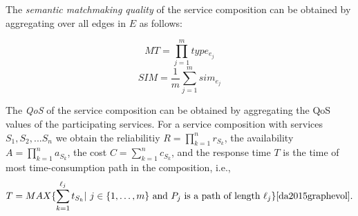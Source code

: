 \documentclass{llncs}
\begin{document}






The \emph{semantic matchmaking quality} of the service composition can be obtained by aggregating over all edges in $E$ as follows:

\begin{equation}
\label{equation6}
MT {=} \prod_{j=1}^{m} type_ {e_{j}}
\end{equation}
\begin{equation}
\label{equation7}
SIM {=} \frac{1}{m}\sum_{j=1}^m sim_ {e_{j}}
\end{equation}

The \emph{QoS} of the service composition can be obtained by aggregating the QoS values of the participating services. For a service composition with services $ S_1, S_2, ... S_n$ we obtain the reliabilitiy $R=\prod\limits^n_{k=1}r_{S_k}$, the availability $A=\prod\limits^n_{k=1}a_{S_k}$, the cost $C=\sum\limits^n_{k=1}c_{S_k}$, and the response time $T$ is the time of most time-consumption path in the composition, i.e., $$T = MAX \{\sum\limits^{\ell_j}_{k=1}t_{S_k} | \text{ $j\in\{1,\ldots,m\}$ and $P_j$ is a path of length $\ell_j$}\} \cite{da2015graphevol}.$$
\end{document}

